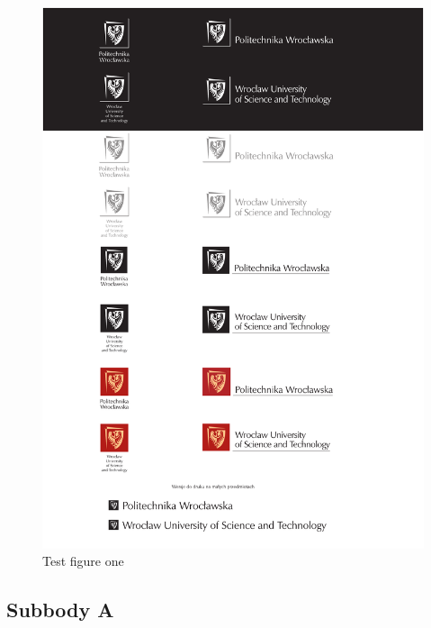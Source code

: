     \noindent
    \begin{figure}[h!]
        \centering
        \includegraphics[scale=0.2]{images/logo-pwr-2016.pdf}
        \caption{Test figure one}
        \label{graphic:figure_one}
    \end{figure}


    \subsection{Subbody A}

